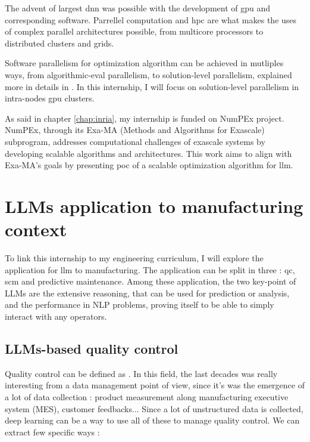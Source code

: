 The advent of largest \acrshort{dnn} was possible with the development of \acrfull{gpu} and corresponding software. Parrellel computation and \acrshort{hpc} are what makes the uses of complex parallel architectures possible, from multicore processors to distributed clusters and grids. 

Software parallelism for optimization algorithm can be achieved in mutliples ways, from algorithmic-eval parallelism, to solution-level parallelism, explained more in details in \cite{kacprzyk_parallel_2015}. In this internship, I will focus on solution-level parallelism in intra-nodes \acrshort{gpu} clusters.

As said in chapter \ref{chap:inria}, my internship is funded on NumPEx project. NumPEx, through its Exa-MA (Methods and Algorithms for Exascale) subprogram, addresses computational challenges of exascale systems by developing scalable algorithms and architectures. This work aims to align with Exa-MA's goals by presenting \acrlong{poc} of a scalable optimization algorithm for \acrshort{llm}.

\section{LLMs application to manufacturing context}
\label{sec:llm_manufacturing}
To link this internship to my engineering curriculum, I will explore the application for \acrshort{llm} to manufacturing. The application can be split in three : \acrfull{qc}, \acrfull{scm} and predictive maintenance. Among these application, the two key-point of LLMs are the extensive reasoning, that can be used for prediction or analysis, and the performance in NLP problems, proving itself to be able to simply interact with any operators.

\subsection{LLMs-based quality control}
\label{sec:llm_quality}
Quality control can be defined as  \cite{noauthor_what_nodate}. In this field, the last decades was really interesting from a data management point of view, since it's was the emergence of a lot of data collection : product measurement along manufacturing executive system (MES), customer feedbacks... Since a lot of unstructured data is collected, deep learning can be a way to use all of these to manage quality control. We can extract few specific ways : 

